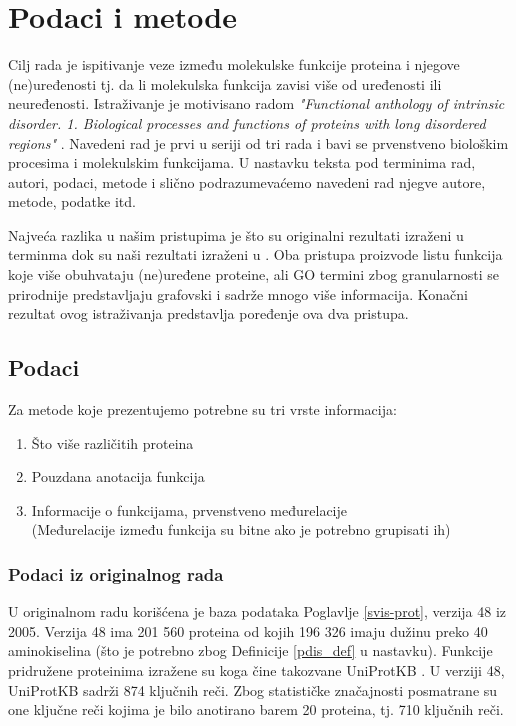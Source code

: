 
\chapter{Podaci i metode} %

\label{Podaci i metode} %

Cilj rada je ispitivanje veze između molekulske funkcije proteina i njegove
(ne)uređenosti tj. da li molekulska funkcija zavisi više od uređenosti ili
neuređenosti. Istraživanje je motivisano radom \textit{"Functional anthology of
intrinsic disorder. 1. Biological processes and functions of proteins with long
disordered regions"} \parencite{Xie2007}. Navedeni rad je prvi u seriji od 
tri rada i bavi se prvenstveno biološkim procesima i molekulskim funkcijama.
U nastavku teksta pod terminima  rad, autori, podaci, metode i slično 
podrazumevaćemo navedeni rad njegve autore, metode, podatke itd.

Najveća razlika u našim pristupima je što su originalni rezultati izraženi u
terminma  dok su naši rezultati izraženi u . Oba pristupa proizvode listu funkcija koje više obuhvataju
(ne)uređene proteine, ali GO termini zbog granularnosti se prirodnije
predstavljaju grafovski i sadrže mnogo više informacija. Konačni rezultat
ovog istraživanja predstavlja poređenje ova dva pristupa.


\section {Podaci}

Za metode koje prezentujemo potrebne su tri vrste informacija:
\begin{enumerate}
  \item Što više različitih proteina
  \item Pouzdana anotacija funkcija
  \item Informacije o funkcijama, prvenstveno međurelacije\\
    (Međurelacije između funkcija su bitne  ako je potrebno grupisati ih)
\end{enumerate}


\subsection{Podaci iz originalnog rada}

U originalnom radu \parencite{Xie2007} korišćena je  baza podataka 
\keyword{\swissprot} Poglavlje \ref{svis-prot}, verzija 48 iz 2005.
Verzija 48 ima 201 560 proteina od kojih 196 326 imaju dužinu preko 40
aminokiselina (što je potrebno zbog Definicije \ref{pdis_def} u nastavku). Funkcije
pridružene proteinima izražene su 
 koga čine takozvane UniProtKB 
. U verziji 48, UniProtKB sadrži 874 ključnih reči.  Zbog
statističke značajnosti posmatrane su one ključne reči kojima je bilo anotirano
barem 20 proteina, tj. 710 ključnih reči.

